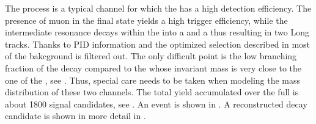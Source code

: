 The \BsJpsiKst process is a typical channel for which the \lhcb has a high detection efficiency.
The presence of muon in the final state yields a high trigger efficiency, while the intermediate
\Kstarz resonance decays within the \velo into a \Kp and a \pim thus resulting in two Long tracks.
Thanks to PID information and the optimized selection described in  most of the bakcground
is filtered out. The only difficult point is the low branching fraction of the \BsJpsiKst decay
compared to the \BdJpsiKst whose invariant mass is very close to the one of the \BsJpsiKst, see .
Thus, special care needs to be taken when modeling the mass distribution of these two channels.
The total \BsJpsiKst yield accumulated over the full \runone is about 1800 signal candidates, see .
An \lhcb event is shown in . A reconstructed \BsJpsiKst decay candidate is shown in
more detail in .

